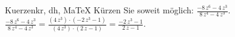 \begin{MAufgabe}{Kuerzen}{kr, dh, MaTeX}
K\"urzen Sie soweit m\"oglich: $\frac{ - 8\, z^6 - 4\, z^3}{8\, z^4 - 4\, z^3}$.\\ 
\ifLsg\MLoesung
\quad $\frac{ - 8\, z^6 - 4\, z^3}{8\, z^4 - 4\, z^3}=\frac{(4\, z^3)\cdot( - 2\, z^3 - 1)}{(4\, z^3)\cdot(2\, z - 1)}=\frac{ - 2\, z^3 - 1}{2\, z - 1}$.\else\relax\fi
 \end{MAufgabe}